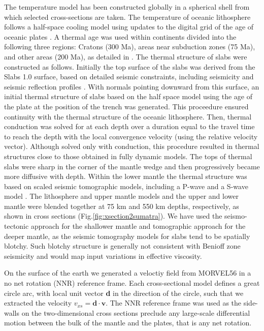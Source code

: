 \documentclass[12pt]{article}
\begin{document}
{The temperature model has been constructed globally in a spherical shell from which selected cross-sections are taken. The temperature of oceanic lithosphere follows a half-space cooling model using  updates to the digital grid of the age of oceanic plates \citep{muller1997digital}.  
A thermal age was used within continents divided into the following three regions: Cratons (300 Ma), areas near subduction zones (75 Ma), and other areas (200 Ma), as detailed in \citep{Stadler27082010}.
The thermal structure of slabs were constructed as follows. 
Initially the top surface of the slabs was derived from the Slabs 1.0 surface, based on detailed seismic constraints, including seismicity and seismic reflection profiles \citep{Hayes2012}.
With normals pointing downward from this surface, an initial thermal structure of slabs based on the half space model using the age of the plate at the position of the trench was generated. This proceedure ensured continuity with the thermal structure of the oceanic lithosphere. Then, thermal conduction was solved for at each depth over a duration equal to the travel time to reach the depth with the local convergence velocity (using the relative velocity vector). Although solved only with conduction, this procedure resulted in thermal structures close to those obtained in fully dynamic models. The tops of thermal  slabs were sharp in the corner of the mantle wedge and then progressively became more diffusive with depth.
Within the lower mantle the thermal structure was based on scaled seismic tomographic models,
including a P-wave \citep{simmons2012llnl} and a S-wave model \citep{ritsema1999complex}.
The lithosphere and upper mantle models and the upper and lower mantle were blended together at 75 km and 550 km depths, respectively, as shown in cross sections (Fig.\ref{fig:xsection2sumatra}).
We have used the seismo-tectonic approach for the shallower mantle and tomographic approach for the deeper mantle, as the seismic tomography models for slabs tend to be spatially blotchy. 
Such blotchy structure is generally not consistent with Benioff zone seismicity and would map input variations in effective viscosity.


On the surface of the earth we generated a veloctiy field from MORVEL56 \citep{GGGE2060} in a no net rotation (NNR) reference frame. Each cross-sectional model defines a great circle arc, with local unit vector \textbf{d} in the direction of the circle, such that we extracted the velocity $v_{xs}=\textbf{d}\cdot\textbf{v}$.  The NNR reference frame was used as the side-walls on the two-dimensional cross sections preclude any large-scale differential motion between the bulk of the mantle and the plates, that is any net rotation.






}
\end{document}
